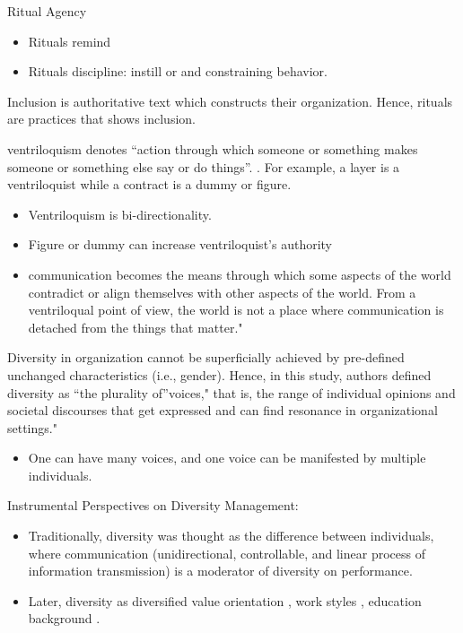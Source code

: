 \documentclass[
]{book}
\providecommand{\tightlist}{%
  \setlength{\itemsep}{0pt}\setlength{\parskip}{0pt}}
\begin{document}
Ritual Agency

\begin{itemize}
\tightlist
\item
  Rituals remind
\item
  Rituals discipline: instill or and constraining behavior.
\end{itemize}

Inclusion is authoritative text which constructs their organization. Hence, rituals are practices that shows inclusion.

\citep{Cooren_2015}

ventriloquism denotes ``action through which someone or something makes someone or something else say or do things''.
\citep{Cooren_2010}. For example, a layer is a ventriloquist while a contract is a dummy or figure.

\begin{itemize}
\tightlist
\item
  Ventriloquism is bi-directionality.
\item
  Figure or dummy can increase ventriloquist's authority
\item
  communication becomes the means through which some aspects of the world contradict or align themselves with other
  aspects of the world. From a ventriloqual point of view, the world is not a place where communication is detached
  from the things that matter."
\end{itemize}

\citep{Trittin_2015}

Diversity in organization cannot be superficially achieved by pre-defined unchanged characteristics (i.e., gender).
Hence, in this study, authors defined diversity as ``the plurality of''voices," that is, the range of individual opinions
and societal discourses that get expressed and can find resonance in organizational settings."

\begin{itemize}
\tightlist
\item
  One can have many voices, and one voice can be manifested by multiple individuals.
\end{itemize}

Instrumental Perspectives on Diversity Management:

\begin{itemize}
\tightlist
\item
  Traditionally, diversity was thought as the difference between individuals, where communication (unidirectional,
  controllable, and linear process of information transmission) is a moderator of diversity on performance.
\item
  Later, diversity as diversified value orientation \citep{Eastman_2003}, work styles \citep{Shelton_2002}, education background
  \citep{Kearney_2009}.
\end{itemize}
\end{document}
